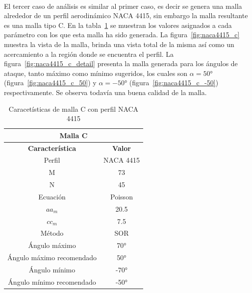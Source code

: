 \documentclass[letterpaper, openright, 12pt]{book}
\begin{document}
    \paragraph*{}
    El tercer caso de análisis es similar al primer caso, es decir se genera
    una malla alrededor de un perfil aerodinámico NACA 4415, sin embargo la
    malla resultante es una malla tipo C. En la tabla~\ref{tabla_c_naca_4415}
    se muestran los valores asignados a cada parámetro con los que esta malla
    ha sido generada. La figura~\ref{fig:naca4415_c} muestra la vista de la
    malla, brinda una vista total de la misma así como un acercamiento a la
    región donde se encuentra el perfil. La figura~\ref{fig:naca4415_c_detail}
    presenta la malla generada para los ángulos de ataque, tanto
    máximo como mínimo sugeridos, los cuales son $\alpha =
    50\si{\degree}$ (figura~\ref{fig:naca4415_c_50}) y
    $\alpha = -50\si{\degree}$ (figura~\ref{fig:naca4415_c_-50}) respectivamente. Se observa todavía una buena
    calidad de la malla.

    \begin{table}[htbp!]
    \begin{center}
        \begin{tabular}{| c | c |}
        \hline
        \multicolumn{2}{|c|}{Malla C}\\

        \hline
        \textbf{Característica} & \textbf{Valor} \\ \hline

        Perfil & NACA 4415
        \\ \hline

        M & 73
        \\ \hline

        N & 45
        \\ \hline

        Ecuación & Poisson
        \\\hline

        $aa_m$ & 20.5
        \\ \hline

        $cc_m$ & 7.5
        \\ \hline

        Método & SOR
        \\\hline

        Ángulo máximo & 70\si{\degree}
        \\ \hline

        Ángulo máximo recomendado & 50\si{\degree}
        \\ \hline

        Ángulo mínimo & -70\si{\degree}
        \\ \hline

        Ángulo mínimo recomendado & -50\si{\degree}
        \\ \hline
        \end{tabular}
        \caption{Caracetísticas de malla C con perfil NACA 4415}
    \label{tabla_c_naca_4415}
    \end{center}
    \end{table}
\end{document}
